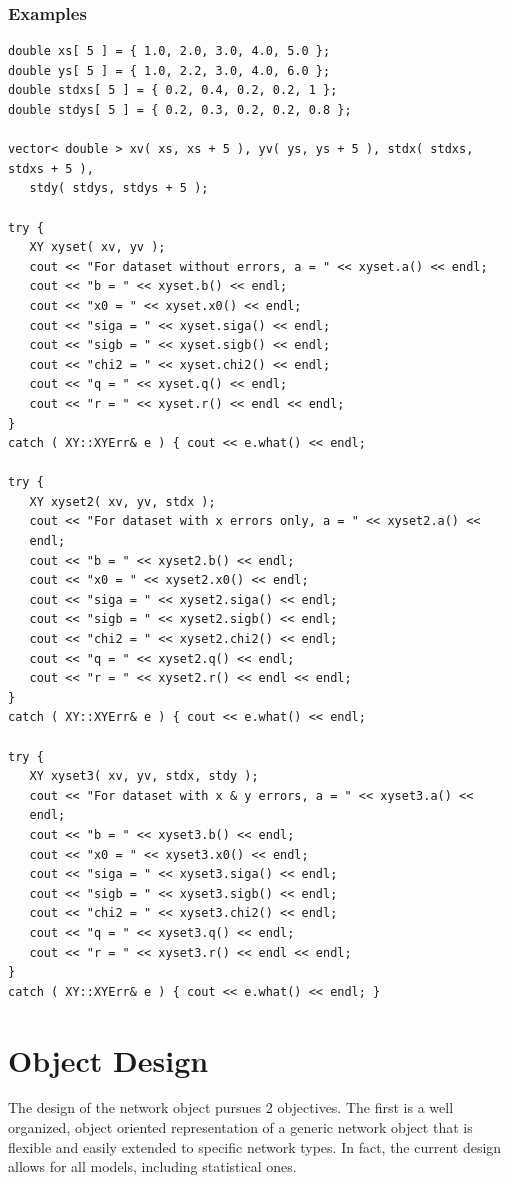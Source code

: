 \documentclass{report}
\newcounter{figcount}
\begin{document}
\subsection{Examples}
\begin{verbatim}
double xs[ 5 ] = { 1.0, 2.0, 3.0, 4.0, 5.0 };
double ys[ 5 ] = { 1.0, 2.2, 3.0, 4.0, 6.0 };
double stdxs[ 5 ] = { 0.2, 0.4, 0.2, 0.2, 1 };
double stdys[ 5 ] = { 0.2, 0.3, 0.2, 0.2, 0.8 };

vector< double > xv( xs, xs + 5 ), yv( ys, ys + 5 ), stdx( stdxs,
stdxs + 5 ),
   stdy( stdys, stdys + 5 );

try {
   XY xyset( xv, yv );
   cout << "For dataset without errors, a = " << xyset.a() << endl;
   cout << "b = " << xyset.b() << endl;
   cout << "x0 = " << xyset.x0() << endl;
   cout << "siga = " << xyset.siga() << endl;
   cout << "sigb = " << xyset.sigb() << endl;
   cout << "chi2 = " << xyset.chi2() << endl;
   cout << "q = " << xyset.q() << endl;
   cout << "r = " << xyset.r() << endl << endl;
}
catch ( XY::XYErr& e ) { cout << e.what() << endl;

try {
   XY xyset2( xv, yv, stdx );
   cout << "For dataset with x errors only, a = " << xyset2.a() <<
   endl;
   cout << "b = " << xyset2.b() << endl;
   cout << "x0 = " << xyset2.x0() << endl;
   cout << "siga = " << xyset2.siga() << endl;
   cout << "sigb = " << xyset2.sigb() << endl;
   cout << "chi2 = " << xyset2.chi2() << endl;
   cout << "q = " << xyset2.q() << endl;
   cout << "r = " << xyset2.r() << endl << endl;
}
catch ( XY::XYErr& e ) { cout << e.what() << endl;

try {
   XY xyset3( xv, yv, stdx, stdy );
   cout << "For dataset with x & y errors, a = " << xyset3.a() <<
   endl;
   cout << "b = " << xyset3.b() << endl;
   cout << "x0 = " << xyset3.x0() << endl;
   cout << "siga = " << xyset3.siga() << endl;
   cout << "sigb = " << xyset3.sigb() << endl;
   cout << "chi2 = " << xyset3.chi2() << endl;
   cout << "q = " << xyset3.q() << endl;
   cout << "r = " << xyset3.r() << endl << endl;
}
catch ( XY::XYErr& e ) { cout << e.what() << endl; }
\end{verbatim}

\chapter{Object Design}\label{obj_chap}
\setcounter{figcount}{1}

The design of the network object pursues 2 objectives.  The first is a
well organized, object oriented representation of a generic network
object that is flexible and easily extended to specific network types.
In fact, the current design allows for all models, including
statistical ones.
\end{document}
